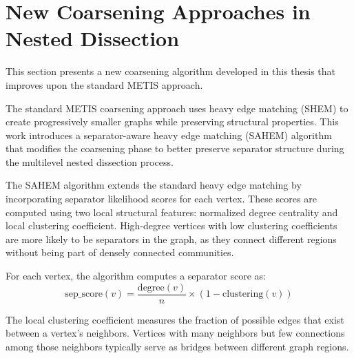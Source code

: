     



\section{New Coarsening Approaches in Nested Dissection}
\label{sec:new_coarsening}

This section presents a new coarsening algorithm developed in this thesis that improves upon the standard METIS approach.

The standard METIS coarsening approach uses heavy edge matching (SHEM) to create progressively smaller graphs while preserving structural properties. This work introduces a separator-aware heavy edge matching (SAHEM) algorithm that modifies the coarsening phase to better preserve separator structure during the multilevel nested dissection process.

The SAHEM algorithm extends the standard heavy edge matching by incorporating separator likelihood scores for each vertex. These scores are computed using two local structural features: normalized degree centrality and local clustering coefficient. High-degree vertices with low clustering coefficients are more likely to be separators in the graph, as they connect different regions without being part of densely connected communities.

For each vertex, the algorithm computes a separator score as:
\[
\text{sep\_score}(v) = \frac{\text{degree}(v)}{n} \times (1 - \text{clustering}(v))
\]

The local clustering coefficient measures the fraction of possible edges that exist between a vertex's neighbors. Vertices with many neighbors but few connections among those neighbors typically serve as bridges between different graph regions.

